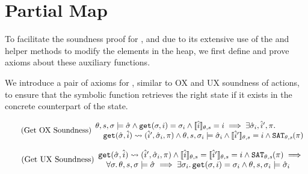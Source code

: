 \section{Partial Map} \label{proofs:pmap-soundness}

To facilitate the soundness proof for \PMap, and due to its extensive use of the  and  helper methods to modify the elements in the heap, we first define and prove axioms about these auxiliary functions.

We introduce a pair of axioms for , similar to OX and UX soundness of actions, to ensure that the symbolic function retrieves the right state if it exists in the concrete counterpart of the state. 

\begin{equation}
\tag{Get OX Soundness}\label{eq:get-complete}
\begin{array}{l}
\theta,s,\sigma \models \hat{\sigma} \land \texttt{get}(\sigma, i)=\sigma_i \land \llbracket\hat{i}\rrbracket_{\theta,s}=i \implies \exists \hat{\sigma}_i, \hat{i}', \pi \ldotp \\
\quad \texttt{get}(\hat{\sigma},\hat{i})\rightsquigarrow(\hat{i}', \hat{\sigma}_i, \pi) \land \theta,s,\sigma_i\models\hat{\sigma}_i \land \llbracket\hat{i}'\rrbracket_{\theta,s}=i \land \texttt{SAT}_{\mathit{\theta,s}}(\pi)
\end{array}
\end{equation}

\begin{equation}
\tag{Get UX Soundness}\label{eq:get-sound}
\begin{array}{l}
\texttt{get}(\hat{\sigma},\hat{i})\rightsquigarrow(\hat{i}', \hat{\sigma}_i, \pi) \land \llbracket\hat{i}\rrbracket_{\theta,s}=\llbracket\hat{i}'\rrbracket_{\theta,s}=i \land \texttt{SAT}_{\mathit{\theta,s}}(\pi) \implies \\
\quad \forall \sigma\ldotp \theta,s,\sigma \models \hat{\sigma} \implies \exists \sigma_i \ldotp \texttt{get}(\sigma, i)=\sigma_i \land \theta,s,\sigma_i \models \hat{\sigma}_i
\end{array}
\end{equation}


